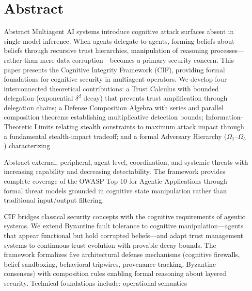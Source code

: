 \documentclass[
  ignorenonframetext,
]{beamer}
\author{\texorpdfstring{}{}}
\date{}
\begin{document}
\section{Abstract}\label{abstract}

\begin{frame}[allowframebreaks]{Abstract}
Multiagent AI systems introduce cognitive attack surfaces absent in
single-model inference. When agents delegate to agents, forming beliefs
about beliefs through recursive trust hierarchies, manipulation of
reasoning processes---rather than mere data corruption---becomes a
primary security concern. This paper presents the Cognitive Integrity
Framework (CIF), providing formal foundations for cognitive security in
multiagent operators. We develop four interconnected theoretical
contributions: a Trust Calculus with bounded delegation (exponential
\(\delta^d\) decay) that prevents trust amplification through delegation
chains; a Defense Composition Algebra with series and parallel
composition theorems establishing multiplicative detection bounds;
Information-Theoretic Limits relating stealth constraints to maximum
attack impact through a fundamental stealth-impact tradeoff; and a
formal Adversary Hierarchy (\(\Omega_1\)--\(\Omega_5\)) characterizing
\end{frame}

\begin{frame}[allowframebreaks]{Abstract}
external, peripheral, agent-level, coordination, and systemic threats
with increasing capability and decreasing detectability. The framework
provides complete coverage of the OWASP Top 10 for Agentic Applications
through formal threat models grounded in cognitive state manipulation
rather than traditional input/output filtering.

CIF bridges classical security concepts with the cognitive requirements
of agentic systems. We extend Byzantine fault tolerance to cognitive
manipulation---agents that appear functional but hold corrupted
beliefs---and adapt trust management systems to continuous trust
evolution with provable decay bounds. The framework formalizes five
architectural defense mechanisms (cognitive firewalls, belief
sandboxing, behavioral tripwires, provenance tracking, Byzantine
consensus) with composition rules enabling formal reasoning about
layered security. Technical foundations include: operational semantics
\end{frame}
\end{document}
